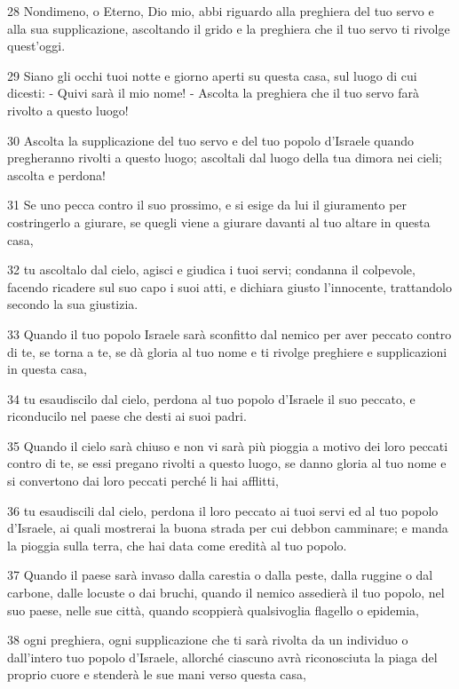 \par 28 Nondimeno, o Eterno, Dio mio, abbi riguardo alla preghiera del tuo servo e alla sua supplicazione, ascoltando il grido e la preghiera che il tuo servo ti rivolge quest'oggi.
\par 29 Siano gli occhi tuoi notte e giorno aperti su questa casa, sul luogo di cui dicesti: - Quivi sarà il mio nome! - Ascolta la preghiera che il tuo servo farà rivolto a questo luogo!
\par 30 Ascolta la supplicazione del tuo servo e del tuo popolo d'Israele quando pregheranno rivolti a questo luogo; ascoltali dal luogo della tua dimora nei cieli; ascolta e perdona!
\par 31 Se uno pecca contro il suo prossimo, e si esige da lui il giuramento per costringerlo a giurare, se quegli viene a giurare davanti al tuo altare in questa casa,
\par 32 tu ascoltalo dal cielo, agisci e giudica i tuoi servi; condanna il colpevole, facendo ricadere sul suo capo i suoi atti, e dichiara giusto l'innocente, trattandolo secondo la sua giustizia.
\par 33 Quando il tuo popolo Israele sarà sconfitto dal nemico per aver peccato contro di te, se torna a te, se dà gloria al tuo nome e ti rivolge preghiere e supplicazioni in questa casa,
\par 34 tu esaudiscilo dal cielo, perdona al tuo popolo d'Israele il suo peccato, e riconducilo nel paese che desti ai suoi padri.
\par 35 Quando il cielo sarà chiuso e non vi sarà più pioggia a motivo dei loro peccati contro di te, se essi pregano rivolti a questo luogo, se danno gloria al tuo nome e si convertono dai loro peccati perché li hai afflitti,
\par 36 tu esaudiscili dal cielo, perdona il loro peccato ai tuoi servi ed al tuo popolo d'Israele, ai quali mostrerai la buona strada per cui debbon camminare; e manda la pioggia sulla terra, che hai data come eredità al tuo popolo.
\par 37 Quando il paese sarà invaso dalla carestia o dalla peste, dalla ruggine o dal carbone, dalle locuste o dai bruchi, quando il nemico assedierà il tuo popolo, nel suo paese, nelle sue città, quando scoppierà qualsivoglia flagello o epidemia,
\par 38 ogni preghiera, ogni supplicazione che ti sarà rivolta da un individuo o dall'intero tuo popolo d'Israele, allorché ciascuno avrà riconosciuta la piaga del proprio cuore e stenderà le sue mani verso questa casa,
